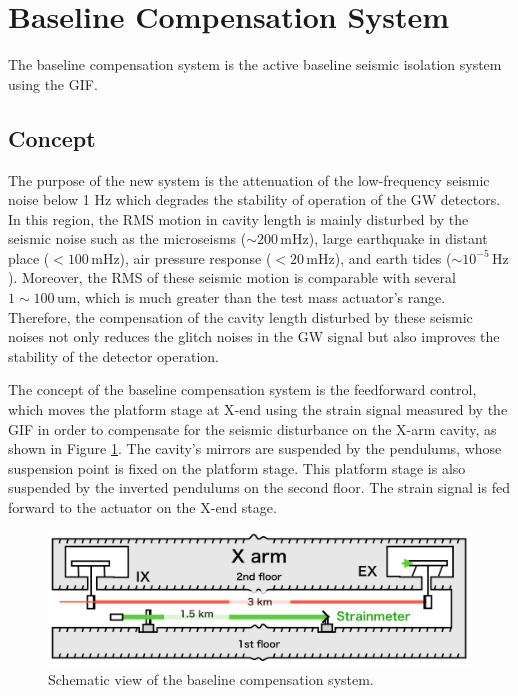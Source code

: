 \section{Baseline Compensation System}\label{sec:54}
The baseline compensation system is the active baseline seismic isolation system using the GIF. 

\subsection{Concept}
The purpose of the new system is the attenuation of the low-frequency seismic noise below 1 Hz which degrades the stability of operation of the GW detectors. In this region, the RMS motion in cavity length is mainly disturbed by the seismic noise such as the microseisms ($\sim 200\,\mathrm{mHz}$), large earthquake in distant place ($< 100\,\mathrm{mHz}$), air pressure response ($< 20\, \mathrm{mHz}$), and earth tides ($\sim 10^{-5}\,\mathrm{Hz}$). Moreover, the RMS of these seismic motion is comparable with several $1\sim100\,\mathrm{um}$, which is much greater than the test mass actuator's range. Therefore, the compensation of the cavity length disturbed by these seismic noises not only reduces the glitch noises in the GW signal but also improves the stability of the detector operation.

The concept of the baseline compensation system is the feedforward control, which moves the platform stage at X-end using the strain signal measured by the GIF in order to compensate for the seismic disturbance on the X-arm cavity, as shown in Figure \ref{img:img512}. The cavity's mirrors are suspended by the pendulums, whose suspension point is fixed on the platform stage. This platform stage is also suspended by the inverted pendulums on the second floor. The strain signal is fed forward to the actuator on the X-end stage.


\begin{figure}[h]
  \begin{center}   
    \includegraphics[width=14cm]{./img_chap5/img512.png}
    \caption{Schematic view of the baseline compensation system.} \label{img:img512}
  \end{center}
\end{figure}

